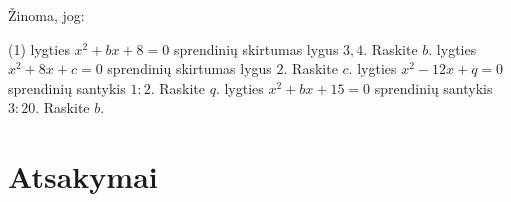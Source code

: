 \documentclass[12pt, a4paper]{scrartcl}
\begin{document}
\begin{problem}
    Žinoma, jog:
      \begin{tasks}[label={(\arabic*)}, label-offset=0.9em](1)
        \task lygties $x ^{2} +bx+8=0$ sprendinių skirtumas lygus $3,4$. Raskite $b$. 
        \task lygties $x ^{2} +8x+c=0$ sprendinių skirtumas lygus $2$. Raskite $c$.
        \task lygties $x ^{2} -12x+q=0$ sprendinių santykis $1:2$. Raskite $q$.
        \task lygties $x ^{2} +bx+15=0$ sprendinių santykis $3:20$. Raskite $b$.
    \end{tasks}
\end{problem}

\newpage
\section{Atsakymai}
\end{document}

